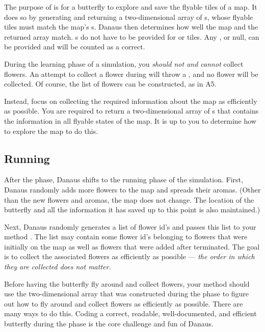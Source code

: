 \documentclass{pset}
\begin{document}
The purpose of  is for a butterfly to explore and save the
flyable tiles of a map. It does so by generating and returning a
two-dimensional array of s, whose flyable tiles must match the
map's s. Danaus then determines how well the map and the
returned array match. s do not have to be provided for
 or  tiles. Any , or null, can be
provided and will be counted as a correct.

During the learning phase of a simulation, you \emph{should not and cannot}
collect flowers. An attempt to collect a flower during  will
throw a , and no flower will be collected.
Of course, the list of flowers can be constructed, as in A5.

Instead, focus on collecting the required information about the map as
efficiently as possible. You are required to return a two-dimensional array of
s that contains the information in all flyable states of the
map. It is up to you to determine how to explore the map to do this. 
\fi

\ifx \RUNNING \undefined \else
\subsection{Running}
After the  phase, Danaus shifts to the running phase of the
simulation. First, Danaus  randomly adds more flowers to the map and spreads
their aromas. (Other than the new flowers and aromas, the map does not change.
The location of the butterfly and all the information it has saved up to this
point is also maintained.)

Next, Danaus  randomly generates a list of flower id's and passes this list to
your method . The list may contain some flower id's belonging to
flowers that were initially on the map as well as flowers that were added after
 terminated. The goal is to collect the associated flowers as
efficiently as possible --- \emph{the order in which they are collected does
not matter.}

Before having the butterfly fly around and collect flowers, your method
 should use the two-dimensional  array that was
constructed during the  phase to figure out how to fly around and
collect flowers as efficiently as possible. There are many ways to do this.
Coding a correct, readable, well-documented, and efficient butterfly during the
 phase is the core challenge and fun of Danaus.
\end{document}
